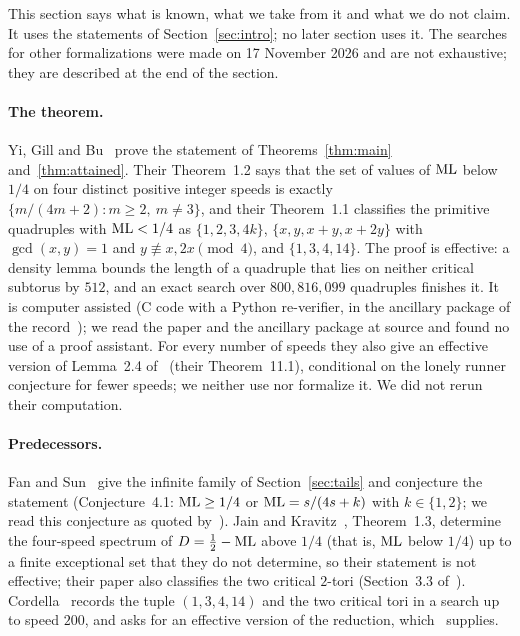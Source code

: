 \documentclass[11pt]{article}
\theoremstyle{remark}
\begin{document}
This section says what is known, what we take from it and what we do not claim. It uses the statements of Section~\ref{sec:intro}; no later section uses it. The searches for other formalizations were made on 17 November 2026 and are not exhaustive; they are described at the end of the section.

\paragraph{The theorem.} Yi, Gill and Bu~\cite{YGB} prove the statement of Theorems~\ref{thm:main} and~\ref{thm:attained}. Their Theorem~1.2 says that the set of values of $\mathrm{ML}$ below $1/4$ on four distinct positive integer speeds is exactly $\{m/(4m+2):m\ge2,\ m\ne3\}$, and their Theorem~1.1 classifies the primitive quadruples with $\mathrm{ML}<1/4$ as $\{1,2,3,4k\}$, $\{x,y,x+y,x+2y\}$ with $\gcd(x,y)=1$ and $y\not\equiv x,2x\pmod 4$, and $\{1,3,4,14\}$. The proof is effective: a density lemma bounds the length of a quadruple that lies on neither critical subtorus by $512$, and an exact search over $800{,}816{,}099$ quadruples finishes it. It is computer assisted (C code with a Python re-verifier, in the ancillary package of the record~\cite{YGB}); we read the paper and the ancillary package at source and found no use of a proof assistant. For every number of speeds they also give an effective version of Lemma~2.4 of~\cite{Cordella} (their Theorem~11.1), conditional on the lonely runner conjecture for fewer speeds; we neither use nor formalize it. We did not rerun their computation.

\paragraph{Predecessors.} Fan and Sun~\cite{FanSun} give the infinite family of Section~\ref{sec:tails} and conjecture the statement (Conjecture~4.1: $\mathrm{ML}\ge1/4$ or $\mathrm{ML}=s/(4s+k)$ with $k\in\{1,2\}$; we read this conjecture as quoted by~\cite{YGB}). Jain and Kravitz~\cite{JK}, Theorem~1.3, determine the four-speed spectrum of $D=\tfrac12-\mathrm{ML}$ above $1/4$ (that is, $\mathrm{ML}$ below $1/4$) up to a finite exceptional set that they do not determine, so their statement is not effective; their paper also classifies the two critical $2$-tori (Section~3.3 of~\cite{JK}). Cordella~\cite{Cordella} records the tuple $(1,3,4,14)$ and the two critical tori in a search up to speed $200$, and asks for an effective version of the reduction, which~\cite{YGB} supplies.
\end{document}
